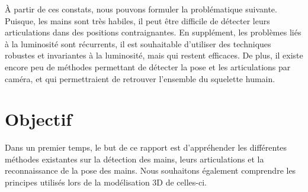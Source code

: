 À partir de ces constats, nous pouvons formuler la problématique 
suivante. Puisque, 
les mains sont très habiles, il peut être difficile de détecter leurs 
articulations dans des positions contraignantes. En supplément, les 
problèmes liés à la luminosité sont récurrents, il est souhaitable 
d'utiliser des techniques robustes et invariantes à la luminosité, 
mais qui restent efficaces. De plus, il existe encore peu de méthodes 
permettant de détecter la pose et les articulations par
caméra, et qui permettraient de retrouver l'ensemble du squelette humain.

\section{Objectif}
%
%
%
%

Dans un premier temps, le but de ce rapport est d'appréhender les 
différentes méthodes existantes sur la détection des mains, leurs 
articulations et la reconnaissance de la pose des mains. Nous souhaitons
également comprendre les principes utilisés lors de la modélisation 3D de
celles-ci.\\ 

